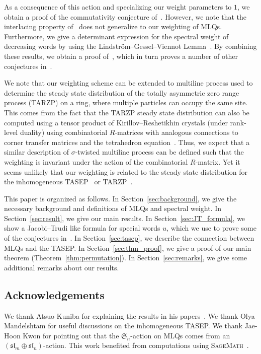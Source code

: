 \documentclass[reqno]{amsart}%
\newcommand{\0}{\phantom{c}}
\theoremstyle{plain}
\theoremstyle{definition}
\numberwithin{equation}{section}
\begin{document}
As a consequence of this action and specializing our weight parameters to $1$,
we obtain a proof of the commutativity conjecture of~\cite{AAMP}. However, we
note that the interlacing property of~\cite{AAMP} does not generalize to our
weighting of MLQs. Furthermore, we give a determinant expression for the
spectral weight of decreasing words by using the Lindstr\"om--Gessel--Viennot
Lemma~\cite{GV85,Lindstrom73}. By combining these results, we obtain a proof
of~\cite[Conj.~3.10]{AasLin17}, which in turn proves a number of other
conjectures in~\cite{AasLin17}.

We note that our weighting scheme can be extended to multiline process used to
determine the steady state distribution of the totally asymmetric zero range
process (TARZP) on a ring, where multiple particles can occupy the same site.
This comes from the fact that the TARZP steady state distribution can also be
computed using a tensor product of Kirillov--Reshetikhin crystals (under
rank-level duality) using combinatorial $R$-matrices with analogous
connections to corner transfer matrices and the tetrahedron
equation~\cite{KMO16TARZP,KMO16TARZPII}. Thus, we expect that a similar
description of $\sigma$-twisted multiline process can be defined such that the
weighting is invariant under the action of the combinatorial $R$-matrix. Yet
it seems unlikely that our weighting is related to the steady state
distribution for the inhomogeneous TASEP~\cite{AM13,AL14} or
TARZP~\cite{KMO16II}.

This paper is organized as follows. In Section~\ref{sec:background}, we give
the necessary background and definitions of MLQs and spectral weight. In
Section~\ref{sec:result}, we give our main results. In
Section~\ref{sec:JT_formula}, we show a Jacobi--Trudi like formula for special
words $u$, which we use to prove some of the conjectures in~\cite{AasLin17}.
In Section~\ref{sec:tasep}, we describe the connection between MLQs and the
TASEP. In Section~\ref{sec:thm_proof}, we give a proof of our main theorem
(Theorem~\ref{thm:permutation}). In Section~\ref{sec:remarks}, we give some
additional remarks about our results.

\subsection{Acknowledgements}

We thank Atsuo Kuniba for explaining the results in his
papers~\cite{KMO15,KMO16II,KMO16,KMO16TARZP,KMO16TARZPII}. We thank Olya
Mandelshtam for useful discussions on the inhomogeneous TASEP. We thank
Jae-Hoon Kwon for pointing out that the $\mathfrak{S}_{n}$-action on MLQs
comes from an $(\mathfrak{sl}_{m} \oplus\mathfrak{sl}_{n})$-action. This work
benefited from computations using \textsc{SageMath}~\cite{sage,combinat}.
\end{document}
